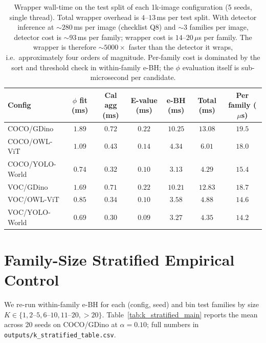 \documentclass{article}
\theoremstyle{remark}
\newcommand{\1}{\mathbf{1}}
\begin{document}
\begin{table}[h]
\centering
\small
\begin{tabular*}{\linewidth}{@{\extracolsep{\fill}}lcccccc@{}}
\toprule
Config & $\phi$ fit (ms) & Cal agg (ms) & E-value (ms) & e-BH (ms) & Total (ms) & Per family ($\mu$s) \\
\midrule
COCO/GDino       & $1.89$ & $0.72$ & $0.22$ & $10.25$ & $13.08$ & $19.5$ \\
COCO/OWL-ViT     & $1.09$ & $0.43$ & $0.14$ & $4.34$  & $6.01$  & $18.0$ \\
COCO/YOLO-World  & $0.74$ & $0.32$ & $0.10$ & $3.13$  & $4.29$  & $15.4$ \\
VOC/GDino        & $1.69$ & $0.71$ & $0.22$ & $10.21$ & $12.83$ & $18.7$ \\
VOC/OWL-ViT      & $0.85$ & $0.34$ & $0.10$ & $3.58$  & $4.88$  & $14.6$ \\
VOC/YOLO-World   & $0.69$ & $0.30$ & $0.09$ & $3.27$  & $4.35$  & $14.2$ \\
\bottomrule
\end{tabular*}
\caption{Wrapper wall-time on the test split of each 1k-image
configuration (5 seeds, single thread). Total wrapper overhead is
$4$--$13$\,ms per test split. With detector inference at
$\sim\!280$\,ms per image (checklist Q8) and $\sim\!3$ families per
image, detector cost is $\sim\!93$\,ms per family; wrapper cost is
$14$--$20\,\mu$s per family. The wrapper is therefore $\sim\!5000\times$
faster than the detector it wraps, i.e.\ approximately four orders
of magnitude. Per-family cost is dominated by the sort and threshold
check in within-family e-BH; the $\phi$ evaluation itself is
sub-microsecond per candidate.}
\label{tab:latency}
\end{table}

\section{Family-Size Stratified Empirical Control}
\label{app:k_stratified}

We re-run within-family e-BH for each (config, seed) and bin test
families by size $K \in \{1, 2$--$5, 6$--$10, 11$--$20, {>}20\}$.
Table~\ref{tab:k_stratified_main} reports the mean across 20 seeds
on COCO/GDino at $\alpha\!=\!0.10$; full numbers in
\texttt{outputs/k\_stratified\_table.csv}.
\end{document}
